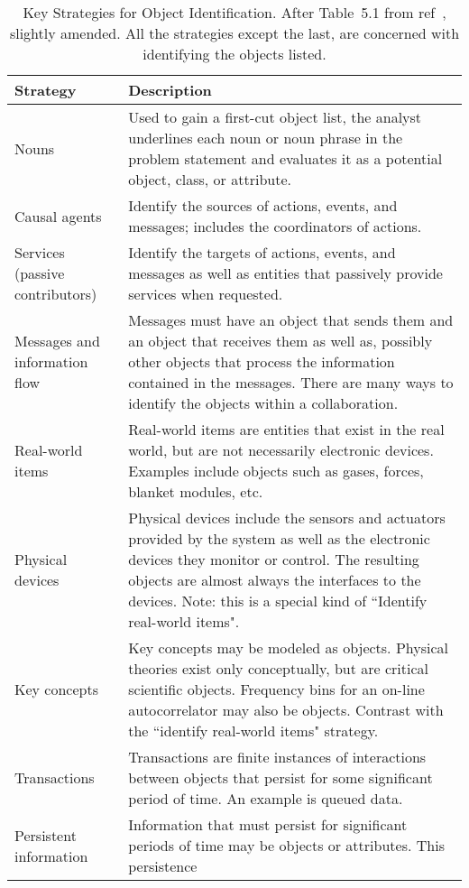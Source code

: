 \begin{table}[h]
\begin{center}
\caption{Key Strategies for Object Identification. After Table~5.1 from ref~\cite{douglass},
slightly amended.
All the strategies except the last, are concerned with identifying the objects listed.
\label{tab:objdisc}}
\begin{tabular}{|p{3.5cm}|p{12.0cm}|}
\hline
Strategy &  Description \\
\hline
\hline
Nouns  &  Used to gain a first-cut object list, the 
analyst underlines each noun or noun phrase in the problem statement and 
evaluates it as a potential object, class, or attribute. \\
\hline
Causal agents &  Identify the sources of actions, events, and messages; includes the 
coordinators of actions. \\
\hline
Services (passive contributors) &  Identify the 
targets of actions, events, and messages as well as entities that passively 
provide services when requested. \\
\hline
Messages and information flow &  Messages 
must have an object that sends them and an object that receives them as well 
as, possibly other objects that process the information contained in the messages.
There are many ways to identify the objects within a collaboration.  \\
\hline
Real-world items &  Real-world items are entities that 
exist in the real world, but are not necessarily electronic devices.  Examples 
include objects such as gases, forces,
blanket modules, etc. \\
\hline
Physical devices &  Physical devices include the sensors and actuators provided by the 
system as well as the electronic devices they monitor or control.  The resulting
objects are almost always the interfaces to the devices.
Note: this is a special kind of ``Identify real-world items". \\
\hline
Key concepts &  Key concepts may be modeled as objects.  Physical theories exist
only conceptually, but are critical scientific objects.  Frequency bins
for an on-line autocorrelator may also be objects. Contrast with
the ``identify real-world items" strategy. \\
\hline
Transactions &  Transactions are finite instances of interactions 
between objects that persist for some significant period of time. An example
is queued data. \\
\hline
Persistent information &  Information that must 
persist for significant periods of time may be objects or attributes.  This persistence

\end{tabular}
\end{center}
\end{table}
